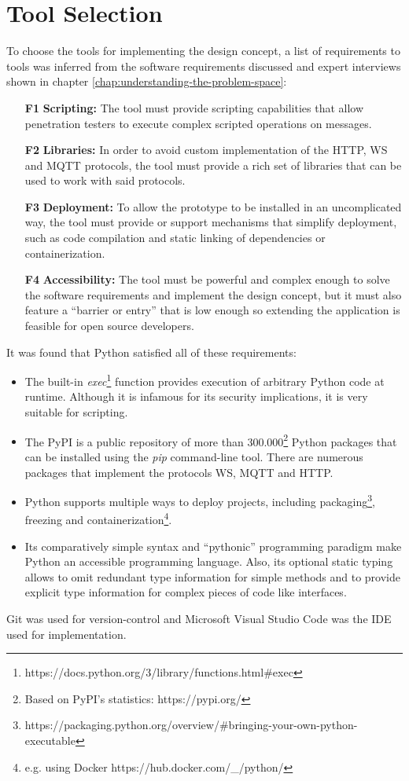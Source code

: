 \section{Tool Selection}
\label{sec:tool-selection}
To choose the tools for implementing the design concept, a list of requirements to tools was inferred from the software requirements discussed and expert interviews shown in chapter \ref{chap:understanding-the-problem-space}:
\begin{itemize}
    \item [\textbf{F1}] \textbf{Scripting:} The tool must provide scripting capabilities that allow penetration testers to execute complex scripted operations on messages.
    \item [\textbf{F2}] \textbf{Libraries:} In order to avoid custom implementation of the \ac{HTTP}, \ac{WS} and \ac{MQTT} protocols, the tool must provide a rich set of libraries that can be used to work with said protocols.
    \item [\textbf{F3}] \textbf{Deployment:} To allow the prototype to be installed in an uncomplicated way, the tool must provide or support mechanisms that simplify deployment, such as code compilation and static linking of dependencies or containerization.
    \item [\textbf{F4}] \textbf{Accessibility:} The tool must be powerful and complex enough to solve the software requirements and implement the design concept, but it must also feature a \enquote{barrier or entry} that is low enough so extending the application is feasible for open source developers.
\end{itemize}

It was found that Python satisfied all of these requirements:
\begin{itemize}
    \item The built-in \emph{exec}\footnote{https://docs.python.org/3/library/functions.html\#exec} function provides execution of arbitrary Python code at runtime. Although it is infamous for its security implications, it is very suitable for scripting.
    \item The \ac{PyPI} is a public repository of more than 300.000\footnote{Based on \ac{PyPI}'s statistics: https://pypi.org/} Python packages that can be installed using the \emph{pip} command-line tool. There are numerous packages that implement the protocols \ac{WS}, \ac{MQTT} and \ac{HTTP}.
    \item Python supports multiple ways to deploy projects, including packaging\footnote{https://packaging.python.org/overview/\#bringing-your-own-python-executable}, freezing and containerization\footnote{e.g. using Docker https://hub.docker.com/\_/python/}.
    \item Its comparatively simple syntax and \enquote{pythonic} programming paradigm make Python an accessible programming language. Also, its optional static typing allows to omit redundant type information for simple methods and to provide explicit type information for complex pieces of code like interfaces.
\end{itemize}
Git was used for version-control and Microsoft Visual Studio Code was the \ac{IDE} used for implementation.

